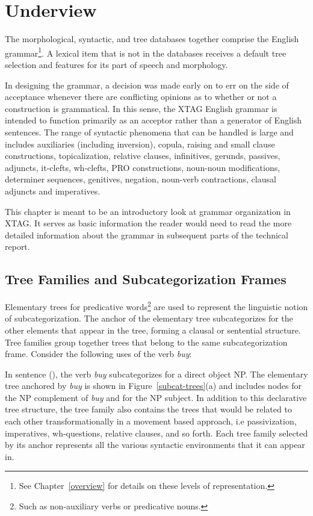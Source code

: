 \chapter{Underview}
\label{underview}

The morphological, syntactic, and tree databases together comprise the
English grammar\footnote{ See Chapter~\ref{overview} for details on
these levels of representation. }.  A lexical item that is not in the
databases receives a default tree selection and features for its part
of speech and morphology.  

In designing the grammar, a decision was made early on to err on the
side of acceptance whenever there are conflicting opinions as to
whether or not a construction is grammatical.  In this sense, the XTAG
English grammar is intended to function primarily as an acceptor
rather than a generator of English sentences.  The range of syntactic
phenomena that can be handled is large and includes auxiliaries
(including inversion), copula, raising and small clause constructions,
topicalization, relative clauses, infinitives, gerunds, passives,
adjuncts, it-clefts, wh-clefts, PRO constructions, noun-noun
modifications, determiner sequences, genitives, negation, noun-verb
contractions, clausal adjuncts and imperatives.

This chapter is meant to be an introductory look at grammar
organization in XTAG. It serves as basic information the reader would
need to read the more detailed information about the grammar in
subsequent parts of the technical report.

\section{Tree Families and Subcategorization Frames}
\label{subcat-frames}

Elementary trees for predicative words\footnote{ Such as non-auxiliary
verbs or predicative nouns. } are used to represent the linguistic
notion of subcategorization.  The anchor of the elementary tree
subcategorizes for the other elements that appear in the tree, forming
a clausal or sentential structure.  Tree families group together trees
that belong to the same subcategorization frame. Consider the
following uses of the verb {\it buy}:


In sentence (), the verb {\it buy} subcategorizes for a direct
object NP.  The elementary tree anchored by {\it buy} is shown in
Figure~\ref{subcat-trees}(a) and includes nodes for the NP complement
of {\it buy} and for the NP subject.  In addition to this declarative
tree structure, the tree family also contains the trees that would be
related to each other transformationally in a movement based approach,
i.e passivization, imperatives, wh-questions, relative clauses, and so
forth.  Each tree family selected by its anchor represents all the
various syntactic environments that it can appear in.

